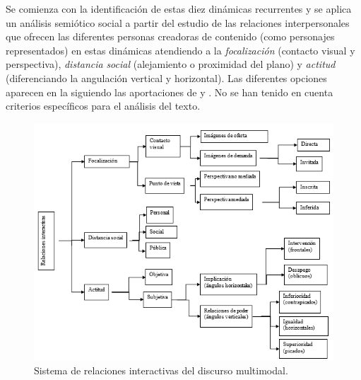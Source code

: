 Se comienza con la identificación de estas diez dinámicas recurrentes y
se aplica un análisis semiótico social a partir del estudio de las
relaciones interpersonales que ofrecen las diferentes personas creadoras
de contenido (como personajes representados) en estas dinámicas
atendiendo a la \emph{focalización} (contacto visual y perspectiva),
\emph{distancia} \emph{social} (alejamiento o proximidad del plano) y
\emph{actitud} (diferenciando la angulación vertical y horizontal). Las
diferentes opciones aparecen en la  siguiendo las aportaciones
de \textcite{canamares2021} y \textcite{martínez-carratala}. No se han tenido en cuenta criterios específicos para el
análisis del texto.

\begin{figure}[htbp]
\begin{minipage}{\textwidth}
\includegraphics[width=\textwidth]{image1}
\caption{Sistema de relaciones interactivas del discurso multimodal.}
\label{fig-image1}
\end{minipage}
\end{figure}

